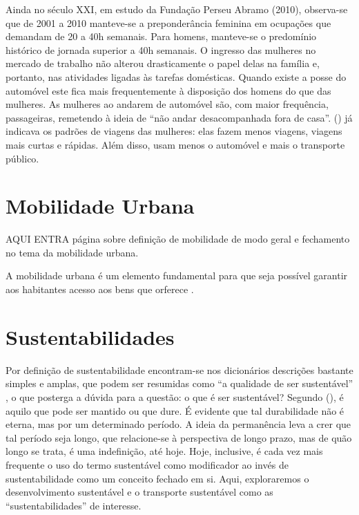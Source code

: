 Ainda no século XXI, em estudo da Fundação Perseu Abramo (2010), observa-se que de 2001 a 2010 manteve-se a preponderância feminina em ocupações que demandam de 20 a 40h semanais.
Para homens, manteve-se o predomínio histórico de jornada superior a 40h semanais. O ingresso das mulheres no mercado de trabalho não alterou drasticamente o papel delas na família e, portanto, nas atividades ligadas às
tarefas domésticas.
Quando existe a posse do automóvel este fica mais frequentemente à disposição dos homens do que das mulheres.
As mulheres ao andarem de automóvel são, com maior frequência, passageiras, remetendo à ideia de “não andar desacompanhada fora de casa”. (\citeyear{FOX1983}) já indicava os padrões de viagens das mulheres: elas fazem menos viagens, viagens mais curtas e rápidas. Além disso, usam menos o automóvel e mais o transporte público.

\clearpage
\section{Mobilidade Urbana}

AQUI ENTRA página sobre definição de mobilidade de modo geral e fechamento no tema da mobilidade urbana.


A mobilidade urbana é um elemento fundamental para que seja possível garantir aos habitantes acesso aos bens que orferece \cite{IEMA2010}.

\clearpage
\section{Sustentabilidades}

Por definição de sustentabilidade encontram-se nos dicionários descrições bastante simples e amplas, que podem ser resumidas como ``a qualidade de ser sustentável'' \cite{MICHAELIS}, o que posterga a dúvida para a questão: o que é ser sustentável? Segundo (\citeyear{BLACK2010}), é aquilo que pode ser mantido ou que dure. É evidente que tal durabilidade não é eterna, mas por um determinado período. A ideia da permanência leva a crer que tal período seja longo, que relacione-se à perspectiva de longo prazo, mas de quão longo se trata, é uma indefinição, até hoje. Hoje, inclusive, é cada vez mais frequente o uso do termo sustentável como modificador ao invés de sustentabilidade como um conceito fechado em si. Aqui, exploraremos o desenvolvimento  sustentável e o transporte sustentável como as ``sustentabilidades'' de interesse.

